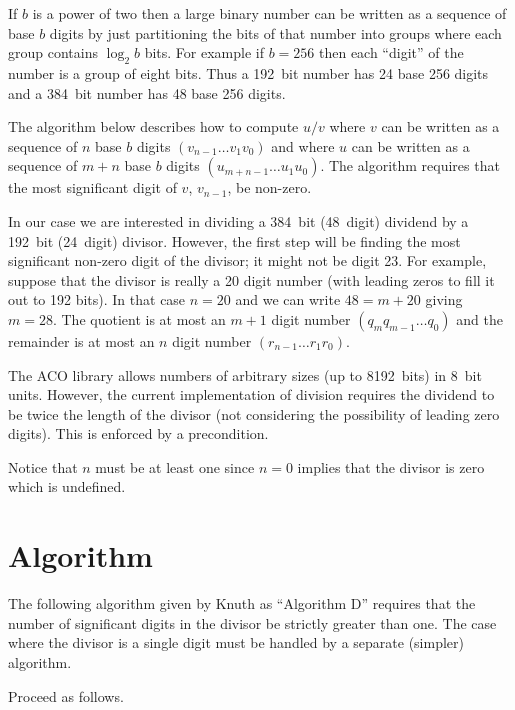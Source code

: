 \documentclass{article}
\begin{document}
If $b$ is a power of two then a large binary number can be written as a sequence of base $b$
digits by just partitioning the bits of that number into groups where each group contains
$\log_2 b$ bits. For example if $b = 256$ then each ``digit'' of the number is a group of eight
bits. Thus a 192~bit number has 24 base 256 digits and a 384~bit number has 48 base 256 digits.

The algorithm below describes how to compute $u/v$ where $v$ can be written as a sequence of $n$
base $b$ digits $(v_{n-1}\ldots v_1 v_0)$ and where $u$ can be written as a sequence of
$m + n$ base $b$ digits $(u_{m+n-1}\ldots u_1 u_0)$. The algorithm requires that the most
significant digit of $v$, $v_{n-1}$, be non-zero.

In our case we are interested in dividing a 384~bit (48~digit) dividend by a 192~bit (24~digit)
divisor. However, the first step will be finding the most significant non-zero digit of the
divisor; it might not be digit 23. For example, suppose that the divisor is really a 20 digit
number (with leading zeros to fill it out to 192 bits). In that case $n = 20$ and we can write
$48 = m + 20$ giving $m = 28$. The quotient is at most an $m + 1$ digit number $(q_m
q_{m-1}\ldots q_0)$ and the remainder is at most an $n$ digit number $(r_{n-1}\ldots r_1 r_0)$.

The ACO library allows numbers of arbitrary sizes (up to 8192~bits) in 8~bit units. However, the
current implementation of division requires the dividend to be twice the length of the divisor
(not considering the possibility of leading zero digits). This is enforced by a precondition.

Notice that $n$ must be at least one since $n = 0$ implies that the divisor is zero which is
undefined.

\section{Algorithm}

The following algorithm given by Knuth \cite{knuth-seminumerical} as ``Algorithm D'' requires
that the number of significant digits in the divisor be strictly greater than one. The case
where the divisor is a single digit must be handled by a separate (simpler) algorithm.

Proceed as follows.
\end{document}
